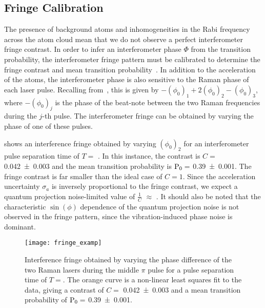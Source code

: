 \subsection{Fringe Calibration}\label{sec:fringe_cal}
The presence of background atoms and inhomogeneities in the Rabi
frequency across the atom cloud mean that we do not observe a perfect
interferometer fringe contrast. In order to infer an interferometer
phase $\Phi$ from the transition probability, the interferometer fringe
pattern must be calibrated to determine the fringe contrast and mean
transition probability~\cite{Peters2001}. 
In addition to the acceleration of the atoms, the interferometer phase
is also sensitive to the Raman phase of each laser pulse. Recalling
from~, this is given by $-(\phi_0)_1
+2(\phi_0)_2 - (\phi_0)_3$, where $-(\phi_0)_j$ is the phase of the
beat-note between the two Raman frequencies during the $j$-th pulse.
The interferometer fringe can be obtained by varying the phase of one
of these pulses.
\par\noindent
{} shows an interference fringe obtained by
varying \((\phi_0)_2\) for an interferometer pulse separation time of
$T=$ . In this instance, the contrast is $C=$
\num{0.042\pm0.003} and the mean
transition probability is $\textnormal{P}_0 =$
 \num{0.39\pm0.001}. The fringe contrast is far smaller than the ideal
 case of $C = 1$. Since the acceleration uncertainty $\sigma_a$ is inversely
 proportional to the fringe contrast, we expect a quantum projection
 noise-limited value of $\frac{1}{C} $
  $\approx$
 . It should also be noted
 that the characteristic $\sin(\phi)$ dependence of the quantum
 projection noise is not observed in the fringe pattern, since the
 vibration-induced phase noise is dominant\nocite{Sugarbaker2013}.
\begin{figure}[htpb!]
  \centering
  \texttt{[image: fringe\_examp]}
  \caption[Interference fringe for \(T = \).]{Interference fringe obtained by varying the phase
    difference of the two Raman lasers during the middle \(\pi\) pulse
    for a pulse separation time of \(T = \). The orange
curve is a non-linear least squares fit to the data, giving a contrast
of $C=$ \num{0.042\pm0.003} and a mean
transition probability of $\textnormal{P}_0 =$
 \num{0.39\pm0.001}.}
 \label{fig:fringe_examp}
\end{figure}
